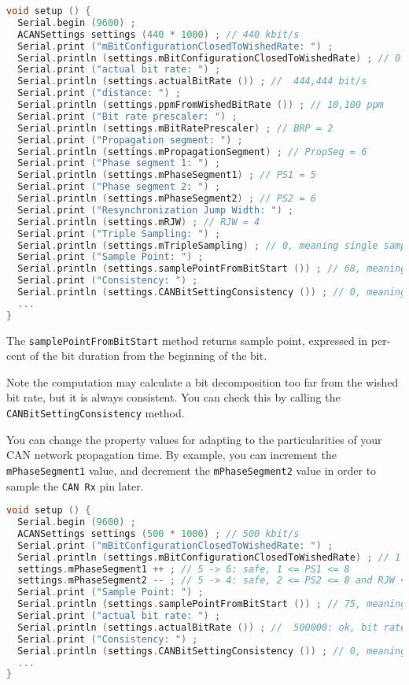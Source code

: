 \documentclass[10pt, a4paper, obeyspaces, openany]{extarticle}
\begin{document}
{ \small\begin{lstlisting}[language=c++]
void setup () {
  Serial.begin (9600) ;
  ACANSettings settings (440 * 1000) ; // 440 kbit/s 
  Serial.print ("mBitConfigurationClosedToWishedRate: ") ;
  Serial.println (settings.mBitConfigurationClosedToWishedRate) ; // 0 (--> is false)
  Serial.print ("actual bit rate: ") ;
  Serial.println (settings.actualBitRate ()) ; //  444,444 bit/s
  Serial.print ("distance: ") ;
  Serial.println (settings.ppmFromWishedBitRate ()) ; // 10,100 ppm
  Serial.print ("Bit rate prescaler: ") ;
  Serial.println (settings.mBitRatePrescaler) ; // BRP = 2
  Serial.print ("Propagation segment: ") ;
  Serial.println (settings.mPropagationSegment) ; // PropSeg = 6
  Serial.print ("Phase segment 1: ") ;
  Serial.println (settings.mPhaseSegment1) ; // PS1 = 5
  Serial.print ("Phase segment 2: ") ;
  Serial.println (settings.mPhaseSegment2) ; // PS2 = 6
  Serial.print ("Resynchronization Jump Width: ") ;
  Serial.println (settings.mRJW) ; // RJW = 4
  Serial.print ("Triple Sampling: ") ;
  Serial.println (settings.mTripleSampling) ; // 0, meaning single sampling
  Serial.print ("Sample Point: ") ;
  Serial.println (settings.samplePointFromBitStart ()) ; // 68, meaning 68%
  Serial.print ("Consistency: ") ;
  Serial.println (settings.CANBitSettingConsistency ()) ; // 0, meaning Ok
  ...
}
\end{lstlisting}}

The \texttt{samplePointFromBitStart} method returns sample point, expressed in per-cent of the bit duration from the beginning of the bit.


Note the computation may calculate a bit decomposition too far from the wished bit rate, but it is always consistent. You can check this by calling the \texttt{CANBitSettingConsistency} method.

You can change the property values for adapting to the particularities of your CAN network propagation time. By example, you can increment the \texttt{mPhaseSegment1} value, and decrement the \texttt{mPhaseSegment2} value in order to sample the \texttt{CAN Rx} pin later.

{ \small\begin{lstlisting}[language=c++]
void setup () {
  Serial.begin (9600) ;
  ACANSettings settings (500 * 1000) ; // 500 kbit/s
  Serial.print ("mBitConfigurationClosedToWishedRate: ") ;
  Serial.println (settings.mBitConfigurationClosedToWishedRate) ; // 1 (--> is true)
  settings.mPhaseSegment1 ++ ; // 5 -> 6: safe, 1 <= PS1 <= 8
  settings.mPhaseSegment2 -- ; // 5 -> 4: safe, 2 <= PS2 <= 8 and RJW <= PS2
  Serial.print ("Sample Point: ") ;
  Serial.println (settings.samplePointFromBitStart ()) ; // 75, meaning 75%
  Serial.print ("actual bit rate: ") ;
  Serial.println (settings.actualBitRate ()) ; //  500000: ok, bit rate did not change
  Serial.print ("Consistency: ") ;
  Serial.println (settings.CANBitSettingConsistency ()) ; // 0, meaning Ok
  ...
}
\end{lstlisting}}
\end{document}

